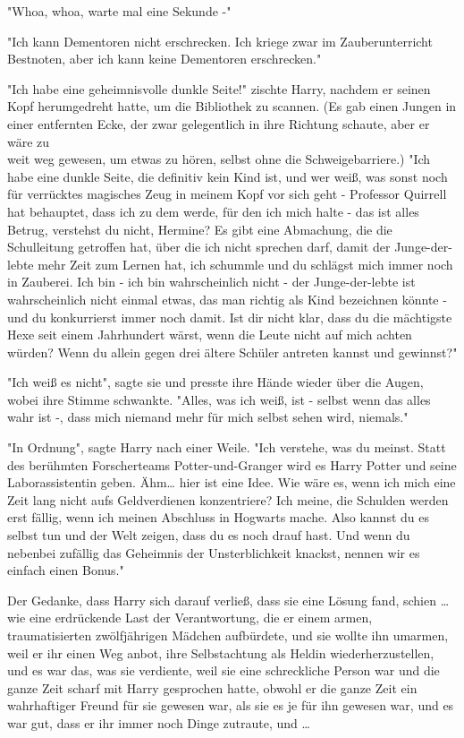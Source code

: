 {"Whoa, whoa, warte mal eine Sekunde -"

"Ich kann Dementoren nicht erschrecken. Ich kriege zwar im Zauberunterricht Bestnoten, aber ich kann keine Dementoren erschrecken."

"Ich habe eine geheimnisvolle dunkle Seite!" zischte Harry, nachdem er seinen Kopf herumgedreht hatte, um die Bibliothek zu scannen. (Es gab einen Jungen in einer entfernten Ecke, der zwar gelegentlich in ihre Richtung schaute, aber er wäre zu\\ weit weg gewesen, um etwas zu hören, selbst ohne die Schweigebarriere.) "Ich habe eine dunkle Seite, die definitiv kein Kind ist, und wer weiß, was sonst noch für verrücktes magisches Zeug in meinem Kopf vor sich geht - Professor Quirrell hat behauptet, dass ich zu dem werde, für den ich mich halte - das ist alles Betrug, verstehst du nicht, Hermine? Es gibt eine Abmachung, die die Schulleitung getroffen hat, über die ich nicht sprechen darf, damit der Junge-der-lebte mehr Zeit zum Lernen hat, ich schummle und du schlägst mich immer noch in Zauberei. Ich bin - ich bin wahrscheinlich nicht - der Junge-der-lebte ist wahrscheinlich nicht einmal etwas, das man richtig als Kind bezeichnen könnte - und du konkurrierst immer noch damit. Ist dir nicht klar, dass du die mächtigste Hexe seit einem Jahrhundert wärst, wenn die Leute nicht auf mich achten würden? Wenn du allein gegen drei ältere Schüler antreten kannst und gewinnst?"

"Ich weiß es nicht", sagte sie und presste ihre Hände wieder über die Augen, wobei ihre Stimme schwankte. "Alles, was ich weiß, ist - selbst wenn das alles wahr ist -, dass mich niemand mehr für mich selbst sehen wird, niemals."

"In Ordnung", sagte Harry nach einer Weile. "Ich verstehe, was du meinst. Statt des berühmten Forscherteams Potter-und-Granger wird es Harry Potter und seine Laborassistentin geben. Ähm… hier ist eine Idee. Wie wäre es, wenn ich mich eine Zeit lang nicht aufs Geldverdienen konzentriere? Ich meine, die Schulden werden erst fällig, wenn ich meinen Abschluss in Hogwarts mache. Also kannst du es selbst tun und der Welt zeigen, dass du es noch drauf hast. Und wenn du nebenbei zufällig das Geheimnis der Unsterblichkeit knackst, nennen wir es einfach einen Bonus."

Der Gedanke, dass Harry sich darauf verließ, dass sie eine Lösung fand, schien … wie eine erdrückende Last der Verantwortung, die er einem armen, traumatisierten zwölfjährigen Mädchen aufbürdete, und sie wollte ihn umarmen, weil er ihr einen Weg anbot, ihre Selbstachtung als Heldin wiederherzustellen, und es war das, was sie verdiente, weil sie eine schreckliche Person war und die ganze Zeit scharf mit Harry gesprochen hatte, obwohl er die ganze Zeit ein wahrhaftiger Freund für sie gewesen war, als sie es je für ihn gewesen war, und es war gut, dass er ihr immer noch Dinge zutraute, und …

}
